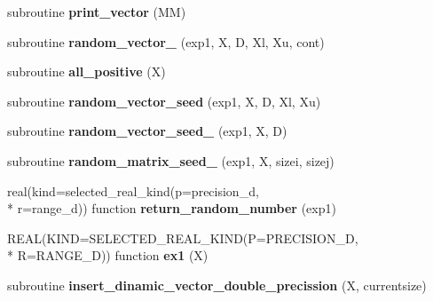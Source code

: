 \begin{DoxyCompactItemize}
\item 
\hypertarget{classcommon__functions_a43bf1b6a875008ecfcf3f1755a061646}{subroutine {\bfseries print\-\_\-vector} (M\-M)}\label{classcommon__functions_a43bf1b6a875008ecfcf3f1755a061646}

\item 
\hypertarget{classcommon__functions_a049948008b37dcfce20ed9bc1cf1ab9a}{subroutine {\bfseries random\-\_\-vector\-\_} (exp1, X, D, Xl, Xu, cont)}\label{classcommon__functions_a049948008b37dcfce20ed9bc1cf1ab9a}

\item 
\hypertarget{classcommon__functions_a7eb917248e6c2f45262254b7ac0d2fe1}{subroutine {\bfseries all\-\_\-positive} (X)}\label{classcommon__functions_a7eb917248e6c2f45262254b7ac0d2fe1}

\item 
\hypertarget{classcommon__functions_aa513271599f88f9462edfdd4c78fabe0}{subroutine {\bfseries random\-\_\-vector\-\_\-seed} (exp1, X, D, Xl, Xu)}\label{classcommon__functions_aa513271599f88f9462edfdd4c78fabe0}

\item 
\hypertarget{classcommon__functions_a3869edd0f5eae8aa09daecb44c96d5be}{subroutine {\bfseries random\-\_\-vector\-\_\-seed\-\_} (exp1, X, D)}\label{classcommon__functions_a3869edd0f5eae8aa09daecb44c96d5be}

\item 
\hypertarget{classcommon__functions_aba84bfc0616ee5ecdc19f0509816f3c6}{subroutine {\bfseries random\-\_\-matrix\-\_\-seed\-\_} (exp1, X, sizei, sizej)}\label{classcommon__functions_aba84bfc0616ee5ecdc19f0509816f3c6}

\item 
\hypertarget{classcommon__functions_a869e6ffa34d2994799154cdf277c1432}{real(kind=selected\-\_\-real\-\_\-kind(p=precision\-\_\-d, \\*
r=range\-\_\-d)) function {\bfseries return\-\_\-random\-\_\-number} (exp1)}\label{classcommon__functions_a869e6ffa34d2994799154cdf277c1432}

\item 
\hypertarget{classcommon__functions_a410c6af7d81a5d09861c6b72886ceb4b}{R\-E\-A\-L(K\-I\-N\-D=S\-E\-L\-E\-C\-T\-E\-D\-\_\-\-R\-E\-A\-L\-\_\-\-K\-I\-N\-D(P=P\-R\-E\-C\-I\-S\-I\-O\-N\-\_\-\-D, \\*
R=R\-A\-N\-G\-E\-\_\-\-D)) function {\bfseries ex1} (X)}\label{classcommon__functions_a410c6af7d81a5d09861c6b72886ceb4b}

\item 
\hypertarget{classcommon__functions_a59b42f78a81adf2073714b47639047bb}{subroutine {\bfseries insert\-\_\-dinamic\-\_\-vector\-\_\-double\-\_\-precission} (X, currentsize)}\label{classcommon__functions_a59b42f78a81adf2073714b47639047bb}


\end{DoxyCompactItemize}
